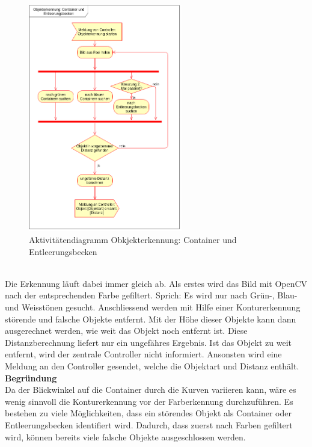 \begin{figure}[H]%
\centering
\includegraphics[width=0.6\textwidth]{03_Loesungskonzept/pictures/objekterkennung_containers.png}
\caption{Aktivitätendiagramm Obkjekterkennung: Container und Entleerungsbecken}
\label{fig:activityContainer}
\end{figure}\\
Die Erkennung läuft dabei immer gleich ab. Als erstes wird das Bild mit OpenCV nach der entsprechenden Farbe gefiltert. Sprich: Es wird nur nach Grün-, Blau- und Weisstönen gesucht. Anschliessend werden mit Hilfe einer Konturerkennung störende und falsche Objekte entfernt. Mit der Höhe dieser Objekte kann dann ausgerechnet werden, wie weit das Objekt  noch entfernt ist. Diese Distanzberechnung liefert nur ein ungefähres Ergebnis. Ist das Objekt zu weit entfernt, wird der zentrale Controller nicht informiert. Ansonsten wird eine Meldung an den Controller gesendet, welche die Objektart und Distanz enthält.
\\[0.2cm]
\textbf{Begründung}\\
Da der Blickwinkel auf die Container durch die Kurven variieren kann, wäre es wenig sinnvoll die Konturerkennung vor der Farberkennung durchzuführen. Es bestehen zu viele Möglichkeiten, dass ein störendes Objekt als Container oder Entleerungsbecken identifiert wird. Dadurch, dass zuerst nach Farben gefiltert wird, können bereits viele falsche Objekte ausgeschlossen werden. \\
